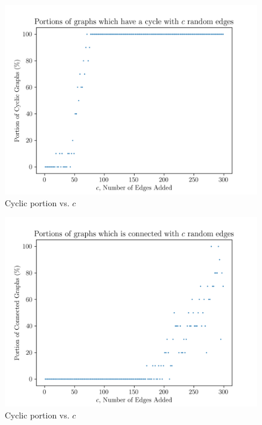 \documentclass[titlepage, 12pt]{article}
\begin{document}
\begin{figure}[h]
  \centering
  \includegraphics[width=0.8\linewidth]{cyclic}
  \caption{Cyclic portion vs. \(c\)}
  \label{fig:cyclic}
\end{figure}
\begin{figure}[h]
  \centering
  \includegraphics[width=0.8\linewidth]{connect}
  \caption{Cyclic portion vs. \(c\)}
  \label{fig:connect}
\end{figure}
\end{document}

